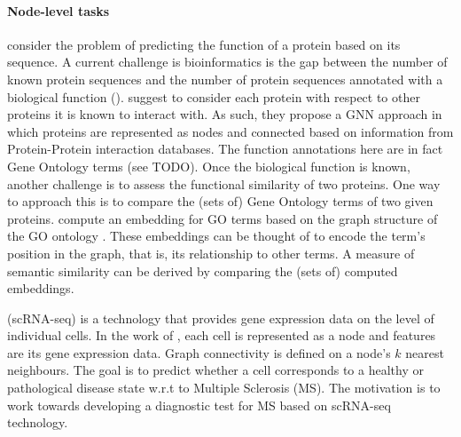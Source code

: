 \documentclass[
	fontsize=10pt, %
	twoside=false, %
	secnumdepth=1, %
]{kaobook}
\begin{document}
\paragraph{Node-level tasks}
\citeauthor{you_DeepGraphGOGraphNeural_2021}
\cite{you_DeepGraphGOGraphNeural_2021} consider the problem of predicting the
function of a protein based on its sequence. A current challenge is
bioinformatics is the gap between the number of known protein sequences and the
number of protein sequences annotated with a biological function
(). \citeauthor{you_DeepGraphGOGraphNeural_2021}
suggest to consider each protein with respect to other proteins it is known to
interact with. As such, they propose a GNN approach in which proteins are
represented as nodes and connected based on information from Protein-Protein
interaction databases. The function annotations here are in fact Gene Ontology
terms (see TODO).
%
Once the biological function is known, another challenge is to assess the
functional similarity of two proteins. One way to approach this is to compare
the (sets of) Gene Ontology terms of two given proteins. 
\citeauthor{zhong_GO2VecTransformingGO_2020} compute an embedding for GO terms
based on the graph structure of the GO ontology
\cite{zhong_GO2VecTransformingGO_2020}.
These embeddings can be thought
of to encode the term's position in the graph, that is, its relationship to
other terms. A measure of semantic similarity can be derived by comparing the
(sets of) computed embeddings.

 (scRNA-seq) is a technology that provides gene
expression data on the level of individual cells. In the work of
\citeauthor{ravindra_disease_2020} \cite{ravindra_disease_2020}, each cell is
represented as a node and features are its gene expression data. Graph
connectivity is defined on a node's $k$ nearest neighbours. The goal is to
predict whether a cell corresponds to a healthy or pathological disease state
w.r.t to Multiple Sclerosis (MS). The motivation is to work towards developing a
diagnostic test for MS based on scRNA-seq technology.

\end{document}
